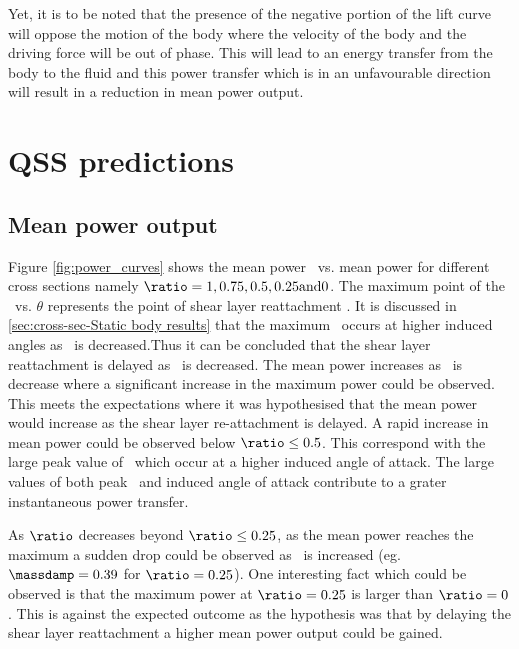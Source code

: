 Yet, it is to be noted that the presence of the negative portion of the lift curve will oppose the motion of the body where the velocity of the body and the driving force will be out of phase. This will lead to an energy transfer from the body to the fluid and this power transfer which is in an unfavourable direction will result in  a reduction in mean power output.

 \section{QSS predictions}
  \label{sec:cross-sec-QSS}
  
 \subsection{Mean power output}
 \label{subsec:cross-sec-qss-mean power}
 

 
Figure \ref{fig:power_curves} shows the mean power \massdamp\ vs. mean power for different cross sections namely $\ratio=1,0.75,0.5,0.25 \text{and} 0$. The maximum point of the \cy\ vs. $\theta$ represents the point of shear layer reattachment \citep{Luo1994}. It is discussed in \ref{sec:cross-sec-Static body results} that the maximum \cy\ occurs at higher induced angles as \ratio\ is decreased.Thus it can be concluded that the shear layer reattachment is delayed as \ratio\ is decreased. The mean power increases as \ratio\ is decrease where a significant increase in the maximum power could be observed. This meets the expectations where it was hypothesised that the mean power would increase as the shear layer re-attachment is delayed. A rapid increase in mean power could be observed below $\ratio\leq0.5$. This correspond with the large peak value of \cy\ which occur at a higher induced angle of attack. The large values of both peak \cy\ and induced angle of attack contribute to a grater instantaneous power transfer. 

As $\ratio$  decreases beyond $\ratio\leq0.25$, as the mean power reaches the maximum a sudden drop could be observed as \massdamp\ is increased (eg. $\massdamp=0.39$ for $\ratio=0.25$). One interesting fact which could be observed is that the maximum power at $\ratio=0.25$ is larger than $\ratio=0$. This is against the expected outcome as the hypothesis was that by delaying the shear layer reattachment a higher mean power output could be gained.

